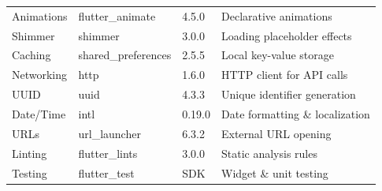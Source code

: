 \documentclass[12pt, a4paper, twoside, openany]{report}
\begin{document}
\begin{table}[ht]
\begin{tabularx}{\textwidth}{lllX}
Animations & flutter\_animate & 4.5.0 & Declarative animations \\
Shimmer & shimmer & 3.0.0 & Loading placeholder effects \\
\addlinespace
Caching & shared\_preferences & 2.5.5 & Local key-value storage \\
Networking & http & 1.6.0 & HTTP client for API calls \\
UUID & uuid & 4.3.3 & Unique identifier generation \\
Date/Time & intl & 0.19.0 & Date formatting \& localization \\
URLs & url\_launcher & 6.3.2 & External URL opening \\
\addlinespace
Linting & flutter\_lints & 3.0.0 & Static analysis rules \\
Testing & flutter\_test & SDK & Widget \& unit testing \\
\bottomrule
\end{tabularx}
\end{table}
\end{document}
